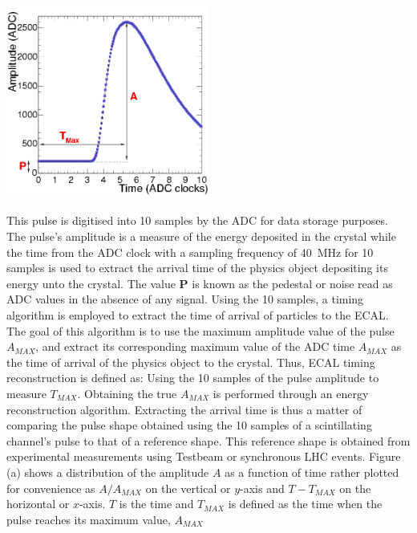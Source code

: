 \begin{center}\label{pulse}
\centering
\mbox{\includegraphics[height=0.5\textwidth, width=0.5\textwidth]{THESISPLOTS/Time_Amplitude_Profile.png}}
\label{fig:pulse}
\end{center}

This pulse is digitised into 10 samples by the ADC for data storage purposes. The pulse's amplitude  is a measure of the energy deposited in the crystal while the time from the ADC clock with a sampling frequency of 40~MHz for 10 samples is used to extract the arrival time of the physics object depositing its energy unto the crystal. The value \textbf{P} is known as the pedestal or noise read as ADC values in the absence of any signal. Using the 10 samples, a timing algorithm is employed to extract the time of arrival of particles to the ECAL. The goal of this algorithm is to use the maximum amplitude value of the pulse $A_{MAX}$, and extract its corresponding maximum value of the ADC time $A_{MAX}$ as the time of arrival of the physics object to the crystal. Thus, ECAL timing reconstruction is defined as: Using the 10 samples of the pulse amplitude to measure $T_{MAX}$. Obtaining the true $A_{MAX}$ is performed through an energy reconstruction algorithm. Extracting the arrival time is thus a matter of comparing the pulse shape obtained using the 10 samples of a scintillating channel's pulse to that of a reference shape.
This reference shape is obtained from experimental measurements using Testbeam or synchronous LHC events. Figure \label{amplVsTmax}(a) shows a distribution of the amplitude $A$ as a function of time rather plotted for convenience as $A/A_{MAX}$ on the vertical or $y$-axis and $T - T_{MAX}$ on the horizontal or $x$-axis. $T$ is the time and $T_{MAX}$ is defined as the time when the  pulse reaches its maximum value, $A_{MAX}$ 

